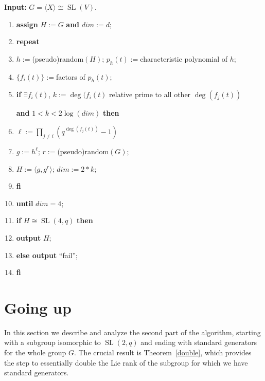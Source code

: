 \documentclass[a4paper,11pt]{article}
\def\SL{\operatorname{SL}}
\renewcommand{\bf}{\textbf} \renewcommand{\L}{\Lambda}
\begin{document}
\noindent
{\bf {Input:}} $G = \langle X \rangle \cong \SL(V)$.
\begin{enumerate}
\item {\bf {assign}} $H := G$ {\bf {and}} $dim := d$;
\item {\bf {repeat}} 
\item \hspace*{1cm} $h:=$(pseudo)random$(H)$; $p_h(t):=$characteristic
polynomial of $h$;
\item \hspace*{1cm} $\{ f_i(t) \}:=$factors of $p_h(t)$;
\item \hspace*{1cm} {\bf {if}} $\exists f_i(t)$, $k:=\deg(f_i(t)$
relative prime to all other $\deg(f_j(t))$

 \hspace*{2cm} {\bf {and}} $1<k<2 \log(dim)$ {\bf {then}}
\item \hspace*{2cm} $\ell:=\prod_{j \ne i} \left(q^{\deg(f_j(t))}-1\right)$
\item \hspace*{2cm} $g:=h^{\ell}$; $r:=$(pseudo)random$(G)$;
\item \hspace*{2cm} $H:=\langle g,g^r \rangle$; $dim := 2*k$;
\item \hspace*{1cm} {\bf {fi}}
\item {\bf {until}} $dim=4$;
\item {\bf {if}} $H \cong \SL(4,q)$ {\bf {then}}
\item \hspace*{1cm} {\bf {output}} $H$;
\item \hspace*{1cm} {\bf {else output}} ``fail'';
\item {\bf {fi}}
\end{enumerate}

\section{Going up}
\label{going up}

In this section we describe and analyze the second part of the
algorithm, starting with a subgroup isomorphic to $\SL(2,q)$ and
ending with standard generators for the whole group $G$. The crucial
result is Theorem~\ref{double}, which provides the step to essentially
double the Lie rank of the subgroup for which we have standard generators.
\end{document}
